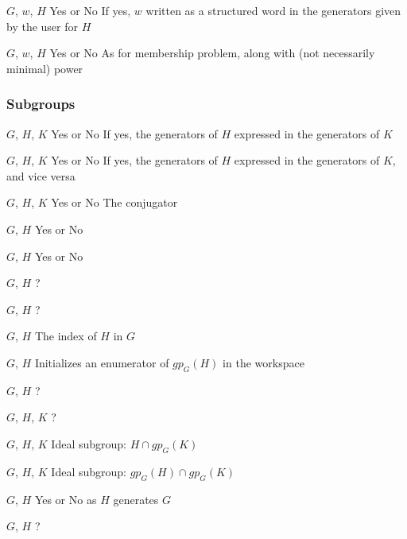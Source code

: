 \begin{enumerate}

{$G$, $w$, $H$}
{Yes or No}
{If yes, $w$ written as a structured word in the generators given by
the user for $H$
}

{$G$, $w$, $H$}
{Yes or No}
{As for membership problem, along with (not necessarily minimal) power}

\end{enumerate}


\subsubsection{Subgroups}


\begin{enumerate}

{$G$, $H$, $K$}
{Yes or No}
{If yes, the generators of $H$ expressed in the generators of $K$}

{$G$, $H$, $K$}
{Yes or No}
{If yes, the generators of $H$ expressed in the generators of $K$, and vice
versa
}

{$G$, $H$, $K$}
{Yes or No}
{The conjugator}

{$G$, $H$}
{Yes or No}

{$G$, $H$}
{Yes or No}

{$G$, $H$}
{?}

{$G$, $H$}
{?}

{$G$, $H$}
{The index of $H$ in $G$}

{$G$, $H$}
{Initializes an enumerator of $gp_G(H)$ in the workspace}

{$G$, $H$}
{?}

{$G$, $H$, $K$}
{?}

{$G$, $H$, $K$}
{Ideal subgroup: $H\cap gp_G(K)$}

{$G$, $H$, $K$}
{Ideal subgroup: $gp_G(H)\cap gp_G(K)$}

{$G$, $H$}
{Yes or No as $H$ generates $G$}

{$G$, $H$}
{?}


\end{enumerate}


